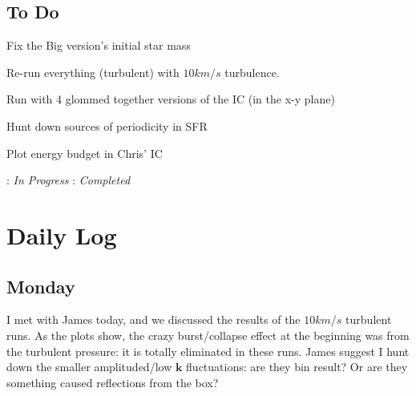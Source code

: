 \documentclass[11pt,letterpaper]{article}
\begin{document}
\subsection*{To Do}
\begin{bullets}
\item \checkmark Fix the Big version's initial star mass
\item \checkmark Re-run everything (turbulent) with $10km/s$ turbulence.
\item \textleaf Run with 4 glommed together versions of the IC (in the x-y plane)
\item Hunt down sources of periodicity in SFR
\item Plot energy budget in Chris' IC
\end{bullets}

\textleaf : \textit{In Progress} \qquad \checkmark : \textit{Completed}

\section*{Daily Log}
\subsection*{Monday}
I met with James today, and we discussed the results of the $10 km/s$ turbulent
runs.  As the plots show, the crazy burst/collapse effect at the beginning was
from the turbulent pressure: it is totally eliminated in these runs.  James
suggest I hunt down the smaller amplituded/low $\mathbf{k}$ fluctuations:
are they bin result? Or are they something caused reflections from the box?
\end{document}

